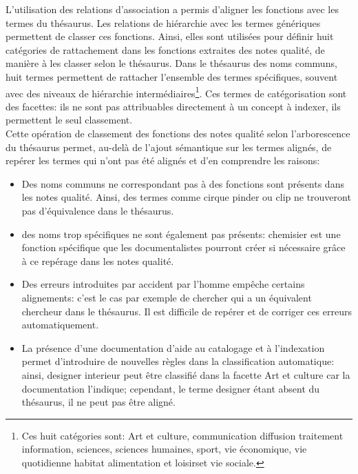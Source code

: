 L'utilisation des relations d'association a permis d'aligner les fonctions avec les termes du thésaurus. Les relations de hiérarchie avec les termes génériques permettent de classer ces fonctions. Ainsi, elles sont utilisées pour définir huit catégories de rattachement dans les fonctions extraites des notes qualité, de manière à les classer selon le thésaurus. Dans le thésaurus des noms communs, huit termes permettent de rattacher l'ensemble des termes spécifiques, souvent avec des niveaux de hiérarchie intermédiaires\footnote{Ces huit catégories sont: \og Art et culture\fg{}, \og communication diffusion traitement information\fg{}, \og sciences\fg{}, \og sciences humaines\fg{}, \og sport\fg{}, \og vie économique\fg{}, \og vie quotidienne habitat alimentation et loisirs\fg et \og vie sociale\fg{}.}. Ces termes de catégorisation sont des facettes: ils ne sont pas attribuables directement à un concept à indexer, ils permettent le seul classement.\\

Cette opération de classement des fonctions des notes qualité selon l'arborescence du thésaurus permet, au-delà de l'ajout sémantique sur les termes alignés, de repérer les termes qui n'ont pas été alignés et d'en comprendre les raisons:
\begin{itemize}
	\item Des noms communs ne correspondant pas à des fonctions sont présents dans les notes qualité. Ainsi, des termes comme \og cirque pinder\fg{} ou \og clip
	\fg{} ne trouveront pas d'équivalence dans le thésaurus.
	\item des noms trop spécifiques ne sont également pas présents: \og chemisier\fg{} est une fonction spécifique que les documentalistes pourront créer si nécessaire grâce à ce repérage dans les notes qualité.
	\item Des erreurs introduites par accident par l'homme empêche certains alignements: c'est le cas par exemple de \og chercher\fg{} qui a un équivalent \og chercheur\fg{} dans le thésaurus. Il est difficile de repérer et de corriger ces erreurs automatiquement.
	\item La présence d'une documentation d'aide au catalogage et à l'indexation permet d'introduire de nouvelles règles dans la classification automatique: ainsi, \og designer interieur\fg{} peut être classifié dans la facette \og Art et culture\fg{} car la documentation l'indique; cependant, le terme \og designer\fg{} étant absent du thésaurus, il ne peut pas être aligné.
\end{itemize}
